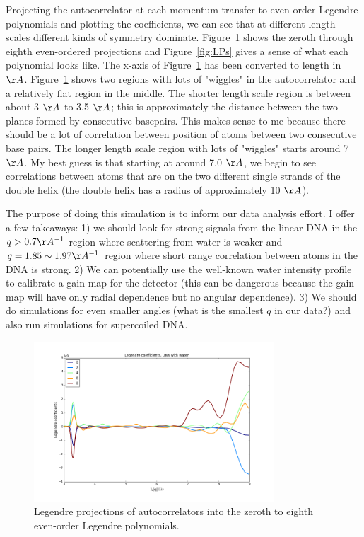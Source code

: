 \documentclass[12pt]{article}
\begin{document}
Projecting the autocorrelator at each momentum transfer to even-order Legendre polynomials and plotting the coefficients, we can see that at different length scales different kinds of symmetry dominate. Figure~\ref{fig:LProj} shows the zeroth through eighth even-ordered projections and Figure~\ref{fig:LPs} gives a sense of what each polynomial looks like. The x-axis of Figure~\ref{fig:LProj} has been converted to length in $\AA$. Figure~\ref{fig:LProj} shows two regions with lots of "wiggles" in the autocorrelator and a relatively flat region in the middle. The shorter length scale region is between about 3 $\AA$ to 3.5 $\AA$; this is approximately the distance between the two planes formed by consecutive basepairs. This makes sense to me because there should be a lot of correlation between position of atoms between two consecutive base pairs. The longer length scale region with lots of "wiggles" starts around 7 $\AA$.  My best guess is that starting at around 7.0 $\AA$, we begin to see correlations between atoms that are on the two different single strands of the double helix (the double helix has a radius of approximately 10 $\AA$). 

The purpose of doing this simulation is to inform our data analysis effort. I offer a few takeaways: 1) we should look for strong signals from the linear DNA in the $q > 0.7 \AA^{-1}$ region where scattering from water is weaker and $q = 1.85  \sim 1.97 \AA^{-1}$ region where short range correlation between atoms in the DNA is strong. 2) We can potentially use the well-known water intensity profile to calibrate a gain map for the detector (this can be dangerous because the gain map will have only radial dependence but no angular dependence). 3) We should do simulations for even smaller angles (what is the smallest $q$ in our data?) and also run simulations for supercoiled DNA.

\begin{figure}[h]
\center
\includegraphics[width=0.8\textwidth]{figures/LProj_real.png}
\caption{Legendre projections of autocorrelators into the zeroth to eighth even-order Legendre polynomials. }
\label{fig:LProj}
\end{figure}
\end{document}
